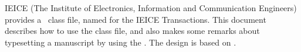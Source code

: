 \begin{summary}
IEICE (The Institute of Electronics, Information and Communication Engineers) 
provides a \LaTeXe\ class file, named 
for the IEICE Transactions. This document describes how to use 
the class file, and also makes some remarks about typesetting 
a manuscript by using the \LaTeXe. The design is based on \LaTeXe.
\end{summary}
